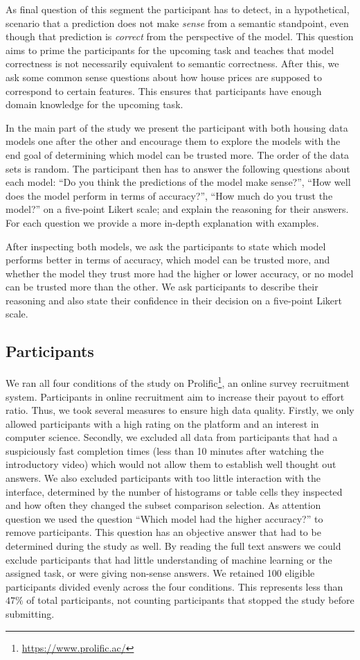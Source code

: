 As final question of this segment the participant has to detect, in a hypothetical, scenario that a prediction does not make \emph{sense} from a semantic standpoint, even though that prediction is \emph{correct} from the perspective of the model.
This question aims to prime the participants for the upcoming task and teaches that model correctness is not necessarily equivalent to semantic correctness.
After this, we ask some common sense questions about how house prices are supposed to correspond to certain features.
This ensures that participants have enough domain knowledge for the upcoming task.

In the main part of the study we present the participant with both housing data models one after the other and encourage them to explore the models with the end goal of determining which model can be trusted more.
The order of the data sets is random.
The participant then has to answer the following questions about each model:
``Do you think the predictions of the model make sense?'',
``How well does the model perform in terms of accuracy?'',
``How much do you trust the model?''
on a five-point Likert scale;
and explain the reasoning for their answers.
For each question we provide a more in-depth explanation with examples.

After inspecting both models, we ask the participants to state which model performs better in terms of accuracy, which model can be trusted more, and whether the model they trust more had the higher or lower accuracy, or no model can be trusted more than the other.
We ask participants to describe their reasoning and also state their confidence in their decision on a five-point Likert scale.

\subsection{Participants}
We ran all four conditions of the study on Prolific\footnote{\url{https://www.prolific.ac/}}, an online survey recruitment system.
Participants in online recruitment aim to increase their payout to effort ratio.
Thus, we took several measures to ensure high data quality.
Firstly, we only allowed participants with a high rating on the platform and an interest in computer science.
Secondly, we excluded all data from participants that had a suspiciously fast completion times (less than 10 minutes after watching the introductory video) which would not allow them to establish well thought out answers.
We also excluded participants with too little interaction with the interface, determined by the number of histograms or table cells they inspected and how often they changed the subset comparison selection.
As attention question we used the question ``Which model had the higher accuracy?'' to remove participants.
This question has an objective answer that had to be determined during the study as well.
By reading the full text answers we could exclude participants that had little understanding of machine learning or the assigned task, or were giving non-sense answers.
We retained 100 eligible participants divided evenly across the four conditions.
This represents less than $47\%$ of total participants, not counting participants that stopped the study before submitting.
